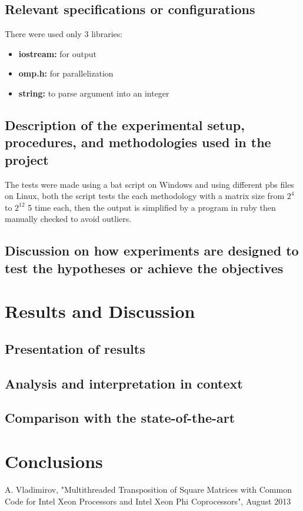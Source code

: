 \documentclass[conference]{IEEEtran}
\begin{document}
\subsection{Relevant specifications or configurations}
There were used only 3 libraries:
\begin{itemize} \item \textbf{iostream:} for output
 \item \textbf{omp.h:} for parallelization
 \item \textbf{string:} to parse argument into an integer
\end{itemize}

\subsection{Description of the experimental setup, procedures, and methodologies used in the project}
The tests were made using a bat script on Windows and using different pbs files on Linux, both the script tests the each methodology with a matrix size from $2^4$ to $2^12$ 5 time each, then the output is simplified by a program in ruby then manually checked to avoid outliers.
\subsection{Discussion on how experiments are designed to test the hypotheses or achieve the objectives}
\section{Results and Discussion}
\subsection{Presentation of results}
\subsection{Analysis and interpretation in context}
\subsection{Comparison with the state-of-the-art}
\section{Conclusions}

\begin{thebibliography}{00}
A. Vladimirov, "Multithreaded Transposition of Square Matrices with Common Code for Intel Xeon Processors and Intel Xeon Phi Coprocessors", August 2013
\end{thebibliography}
\end{document}
